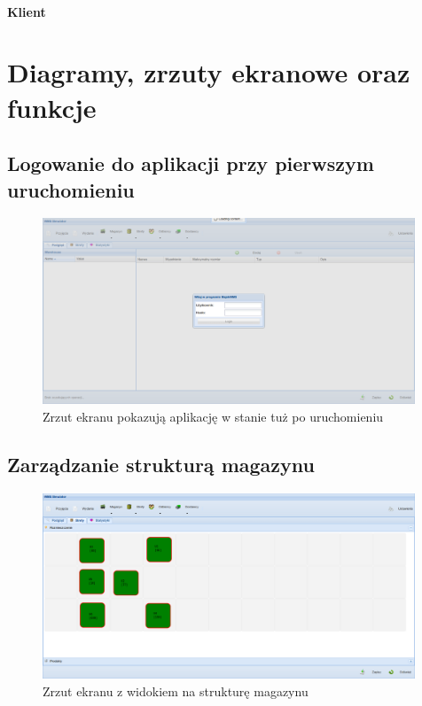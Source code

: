 		\paragraph{Klient}
\section{Diagramy, zrzuty ekranowe oraz funkcje}
	\subsection{Logowanie do aplikacji przy pierwszym uruchomieniu}
		\begin{figure}[H]
			\centering
			\includegraphics[width=0.99\textwidth]{images/app/login}
			\caption[Aplikacja - Logowanie do programu]{Zrzut ekranu pokazują aplikację w stanie tuż po uruchomieniu}
			\label{c7:fig:app:login}
		\end{figure}
		
	\subsection{Zarządzanie strukturą magazynu}
		\begin{figure}[H]
			\centering
			\includegraphics[width=0.99\textwidth]{images/app/unit_preview}
			\caption[Aplikacja - Zarządzania strukturą magazynu]{Zrzut ekranu z widokiem na strukturę magazynu}
			\label{c7:fig:app:unit_preview}
		\end{figure}
		
